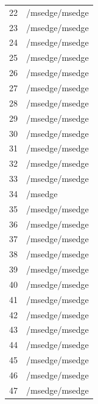 \documentclass[a4paper,twoside,12pt]{book}
\begin{document}
\begin{appendices}
\begin{table}
\begin{tabular}{ll}
		22  &                                     /msedge/msedge \\
		23  &                                     /msedge/msedge \\
		24  &                                     /msedge/msedge \\
		25  &                                     /msedge/msedge \\
		26  &                                     /msedge/msedge \\
		27  &                                     /msedge/msedge \\
		28  &                                     /msedge/msedge \\
		29  &                                     /msedge/msedge \\
		30  &                                     /msedge/msedge \\
		31  &                                     /msedge/msedge \\
		32  &                                     /msedge/msedge \\
		33  &                                     /msedge/msedge \\
		34  &                                            /msedge \\
		35  &                                     /msedge/msedge \\
		36  &                                     /msedge/msedge \\
		37  &                                     /msedge/msedge \\
		38  &                                     /msedge/msedge \\
		39  &                                     /msedge/msedge \\
		40  &                                     /msedge/msedge \\
		41  &                                     /msedge/msedge \\
		42  &                                     /msedge/msedge \\
		43  &                                     /msedge/msedge \\
		44  &                                     /msedge/msedge \\
		45  &                                     /msedge/msedge \\
		46  &                                     /msedge/msedge \\
		47  &                                     /msedge/msedge \\

\end{tabular}
\end{table}
\end{appendices}
\end{document}
